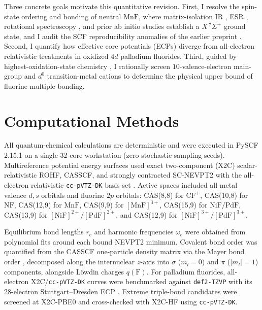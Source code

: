 \documentclass[10pt,twocolumn]{article}
\begin{document}
Three concrete goals motivate this quantitative revision. First, I resolve the spin-state ordering and bonding of neutral $\mathrm{MnF}$, where matrix-isolation IR \cite{brosi2016}, ESR \cite{devore1978}, rotational spectroscopy \cite{sheridan2003}, and prior ab initio studies \cite{koukounas2004} establish a $X\,^7\Sigma^+$ ground state, and I audit the SCF reproducibility anomalies of the earlier preprint \cite{seeger1977}. Second, I quantify how effective core potentials (ECPs) \cite{weigend2005} diverge from all-electron relativistic treatments \cite{pyykko2012} in oxidized $4d$ palladium fluorides. Third, guided by highest-oxidation-state chemistry \cite{riedel2009}, I rationally screen $10$-valence-electron main-group and $d^0$ transition-metal cations to determine the physical upper bound of fluorine multiple bonding.

\section{Computational Methods}
All quantum-chemical calculations are deterministic and were executed in PySCF 2.15.1 \cite{sun2020} on a single 32-core workstation (zero stochastic sampling seeds). Multireference potential energy surfaces used exact two-component (X2C) scalar-relativistic ROHF, CASSCF, and strongly contracted SC-NEVPT2 \cite{angeli2001} with the all-electron relativistic \texttt{cc-pVTZ-DK} basis set \cite{balabanov2005}. Active spaces included all metal valence $d,s$ orbitals and fluorine $2p$ orbitals: CAS(8,8) for $\mathrm{CF}^+$, CAS(10,8) for $\mathrm{NF}$, CAS(12,9) for $\mathrm{MnF}$, CAS(9,9) for $[\mathrm{MnF}]^{3+}$, CAS(15,9) for $\mathrm{NiF}/\mathrm{PdF}$, CAS(13,9) for $[\mathrm{NiF}]^{2+}/[\mathrm{PdF}]^{2+}$, and CAS(12,9) for $[\mathrm{NiF}]^{3+}/[\mathrm{PdF}]^{3+}$.

Equilibrium bond lengths $r_e$ and harmonic frequencies $\omega_e$ were obtained from polynomial fits around each bound NEVPT2 minimum. Covalent bond order was quantified from the CASSCF one-particle density matrix via the Mayer bond order \cite{mayer1983}, decomposed along the internuclear $z$-axis into $\sigma$ ($m_l = 0$) and $\pi$ ($|m_l| = 1$) components, alongside L\"owdin charges $q(\mathrm{F})$. For palladium fluorides, all-electron X2C/\texttt{cc-pVTZ-DK} curves were benchmarked against \texttt{def2-TZVP} with its 28-electron Stuttgart--Dresden ECP \cite{weigend2005}. Extreme triple-bond candidates were screened at X2C-PBE0 \cite{adamo1999} and cross-checked with X2C-HF using \texttt{cc-pVTZ-DK}.
\end{document}
